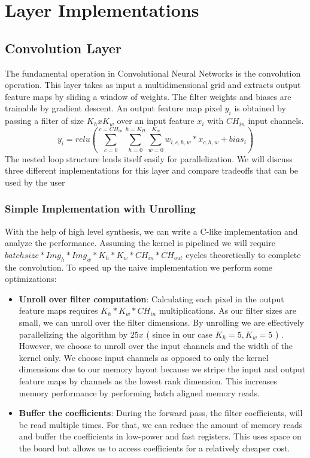 \section{Layer Implementations}

\subsection{Convolution Layer}

The fundamental operation in Convolutional Neural Networks is the convolution operation. This layer takes as input a multidimensional grid and extracts output feature maps by sliding a window of weights. The filter weights and biases are trainable by gradient descent. An output feature map pixel $ \mathit{y_{i}} $ is obtained by passing a filter of size $ K_{h}xK_{w} $ over an input feature $ \mathit{x_{i}} $ with $ \mathit{CH_{in}} $ input channels.
\begin{equation}
 y_{i} = relu(\sum_{c=0}^{c=CH_{in}} \sum_{h=0}^{h=K_{H}} \sum_{w=0}^{K_{w}} w_{i,c,h,w} * x_{c,h,w}  + bias_i ) 
\label{eqn:summat}
\end{equation}
The nested loop structure lends itself easily for parallelization.  We will discuss three different implementations for this layer and compare tradeoffs that can be used by the user 

\subsubsection{Simple Implementation with Unrolling} \label{simpleimpl}

With the help of high level synthesis, we can write a C-like implementation and analyze the performance. Assuming the kernel is pipelined we will require $ batch size * Img_h * Img_w * K_h * K_w * CH_{in} * CH_{out}  $ cycles theoretically to complete the convolution. To speed up the naive implementation we perform some optimizations:

\begin{itemize}
\item
\textbf{Unroll over filter computation}: Calculating each pixel in the output feature maps requires $ K_h * K_w * CH_{in} $ multiplications. As our filter sizes are small, we can unroll over the filter dimensions. By unrolling we are effectively parallelizing the algorithm by $ \mathit{25x} $ ( since in our case $ K_h = 5, K_w=5 $ ) . However, we choose to unroll over the input channels and the width of the kernel only. We choose input channels as opposed to only the kernel dimensions due to our memory layout because we stripe the input and  output feature maps by channels as the lowest rank dimension. This increases memory performance by performing batch aligned memory reads. 

\item
\textbf{Buffer the coefficients}: During the forward pass, the filter coefficients, will be read multiple times.  For that, we can reduce the amount of memory reads and buffer the coefficients in low-power and fast registers. This uses space on the board but allows us to access coefficients for a relatively cheaper cost.
\end{itemize}

